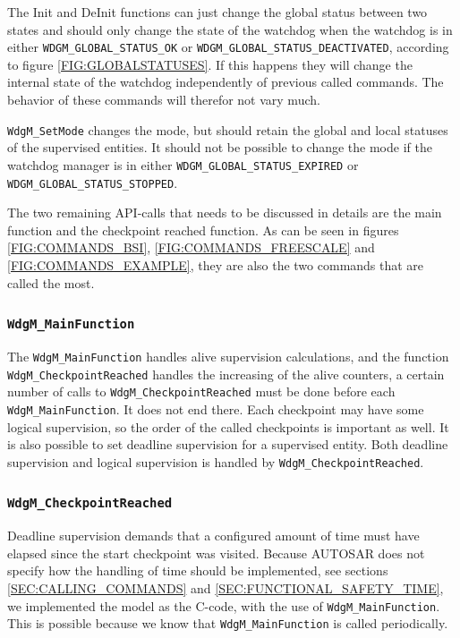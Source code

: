 The Init and DeInit functions can just change the global status
between two states and should only change the state of the watchdog
when the watchdog is in either \lstinline!WDGM_GLOBAL_STATUS_OK! or
\lstinline!WDGM_GLOBAL_STATUS_DEACTIVATED!, according to figure
\ref{FIG:GLOBALSTATUSES}. If this happens they will change the
internal state of the watchdog independently of previous called
commands. The behavior of these commands will therefor not vary much.

\lstinline!WdgM_SetMode! changes the mode, but should retain the
global and local statuses of the supervised entities. It should not be
possible to change the mode if the watchdog manager is in either
\lstinline!WDGM_GLOBAL_STATUS_EXPIRED! or
\lstinline!WDGM_GLOBAL_STATUS_STOPPED!.

The two remaining API-calls that needs to be discussed in details are
the main function and the checkpoint reached function. As can be seen
in figures \ref{FIG:COMMANDS_BSI}, \ref{FIG:COMMANDS_FREESCALE} and
\ref{FIG:COMMANDS_EXAMPLE}, they are also the two commands that are
called the most.

\subsubsection{\lstinline!WdgM_MainFunction!}
The \lstinline!WdgM_MainFunction! handles alive supervision
calculations, and the function \lstinline!WdgM_CheckpointReached!
handles the increasing of the alive counters, a certain number of
calls to \lstinline!WdgM_CheckpointReached! must be done before each
\lstinline!WdgM_MainFunction!. It does not end there. Each checkpoint
may have some logical supervision, so the order of the called
checkpoints is important as well. It is also possible to set deadline
supervision for a supervised entity. Both deadline supervision and
logical supervision is handled by \lstinline!WdgM_CheckpointReached!.

\subsubsection{\lstinline!WdgM_CheckpointReached!}
Deadline supervision demands that a configured amount of time must
have elapsed since the start checkpoint was visited. Because AUTOSAR
does not specify how the handling of time should be implemented, see
sections \ref{SEC:CALLING_COMMANDS} and
\ref{SEC:FUNCTIONAL_SAFETY_TIME}, we implemented the model as the
C-code, with the use of \lstinline!WdgM_MainFunction!. This is
possible because we know that \lstinline!WdgM_MainFunction! is called
periodically.

